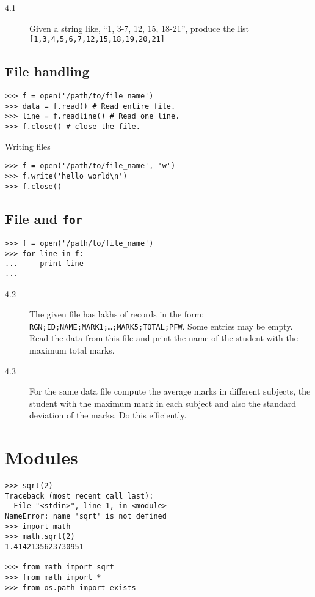 \documentclass[12pt]{article}
\begin{document}
  \begin{description}
    \item[4.1] Given a string like, ``1, 3-7, 12, 15, 18-21'', produce the list \texttt{[1,3,4,5,6,7,12,15,18,19,20,21]}
\end{description}

  \subsection{File handling}
\begin{verbatim}
>>> f = open('/path/to/file_name')
>>> data = f.read() # Read entire file.
>>> line = f.readline() # Read one line.
>>> f.close() # close the file.
\end{verbatim}
Writing files
\begin{verbatim}
>>> f = open('/path/to/file_name', 'w')
>>> f.write('hello world\n')
>>> f.close()
\end{verbatim}

    \subsection{File and \texttt{for}}
\begin{verbatim}
>>> f = open('/path/to/file_name')
>>> for line in f:
...     print line
...
\end{verbatim}

  \begin{description}
    \item[4.2] The given file has lakhs of records in the form:
    \texttt{RGN;ID;NAME;MARK1;\ldots;MARK5;TOTAL;PFW}.
    Some entries may be empty.  Read the data from this file and print the
    name of the student with the maximum total marks.
  \item[4.3] For the same data file compute the average marks in different
    subjects, the student with the maximum mark in each subject and also
    the standard deviation of the marks.  Do this efficiently.
\end{description}

\section{Modules}
\begin{verbatim}
>>> sqrt(2)
Traceback (most recent call last):
  File "<stdin>", line 1, in <module>
NameError: name 'sqrt' is not defined
>>> import math        
>>> math.sqrt(2)
1.4142135623730951

>>> from math import sqrt
>>> from math import *
>>> from os.path import exists
\end{verbatim}
\end{document}
